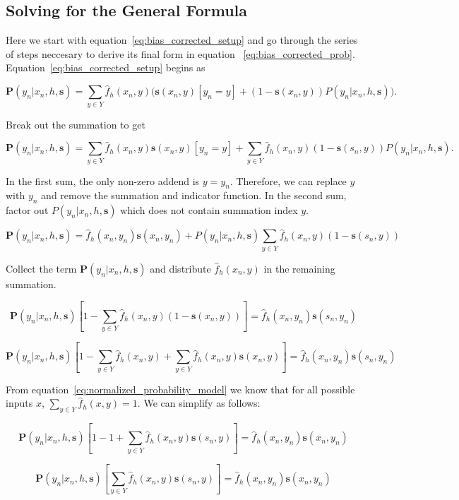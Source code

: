 \documentclass[twoside]{article}
\begin{document}
\begin{appendices}

\section{Solving for the General Formula}
\label{appendix:solving}

Here we start with equation~\eqref{eq:bias_corrected_setup} and go through the series of steps neccesary to derive its final form in equation ~\eqref{eq:bias_corrected_prob}. Equation~\eqref{eq:bias_corrected_setup} begins as

\[\mathbf{P}(y_n|x_n,h,\mathbf{s})=\sum_{y \in Y}\hat{f}_h(x_n,y)\big(\mathbf{s}(x_n,y)\left [y_n = y\right ] + (1-\mathbf{s}(x_n,y))P(y_n|x_n,h,\mathbf{s})\big).\]

Break out the summation to get

\[\mathbf{P}(y_n|x_n,h,\mathbf{s})=\sum_{y \in Y}\hat{f}_h(x_n,y)\mathbf{s}(x_n,y)\left [y_n = y\right ] +\sum_{y \in Y}\hat{f}_h(x_n,y)(1-\mathbf{s}(s_n,y))P(y_n|x_n,h,\mathbf{s}).\]

In the first sum, the only non-zero addend is \(y = y_n\). Therefore, we can replace \(y\) with \(y_n\) and remove the summation and indicator function. In the second sum, factor out \(P(y_n|x_n,h,\mathbf{s})\) which does not contain summation index \(y\).

\[\mathbf{P}(y_n|x_n,h,\mathbf{s})=\hat{f}_h(x_n,y_n)\mathbf{s}(x_n,y_n) +P(y_n|x_n,h,\mathbf{s})\sum_{y \in Y}\hat{f}_h(x_n,y)(1-\mathbf{s}(s_n,y))\]

Collect the term \(\mathbf{P}(y_n|x_n,h,\mathbf{s})\) and distribute \(\hat{f}_h(x_n,y)\) in the remaining summation.

\[\mathbf{P}(y_n|x_n,h,\mathbf{s})\left [ 1 - \sum_{y \in Y}\hat{f}_h(x_n,y)(1-\mathbf{s}(x_n,y)) \right ]=\hat{f}_h(x_n,y_n)\mathbf{s}(s_n,y_n) \]

\[\mathbf{P}(y_n|x_n,h,\mathbf{s})\left [ 1 - \sum_{y \in Y}\hat{f}_h(x_n,y)+\sum_{y \in Y}\hat{f}_h(x_n,y)\mathbf{s}(x_n,y) \right ]=\hat{f}_h(x_n,y_n)\mathbf{s}(s_n,y_n) \]

From equation~\eqref{eq:normalized_probability_model} we know that for all possible inputs \(x\), \(\sum_{y \in Y} \hat{f}_h(x, y) = 1\). We can simplify as follows:

\[\mathbf{P}(y_n|x_n,h,\mathbf{s})\left [ 1 - 1+\sum_{y \in Y}\hat{f}_h(x_n,y)\mathbf{s}(s_n,y) \right ]=\hat{f}_h(x_n,y_n)\mathbf{s}(x_n,y_n) \]

\[\mathbf{P}(y_n|x_n,h,\mathbf{s})\left [\sum_{y \in Y}\hat{f}_h(x_n,y)\mathbf{s}(s_n,y) \right ]=\hat{f}_h(x_n,y_n)\mathbf{s}(x_n,y_n) \]


\end{appendices}
\end{document}
